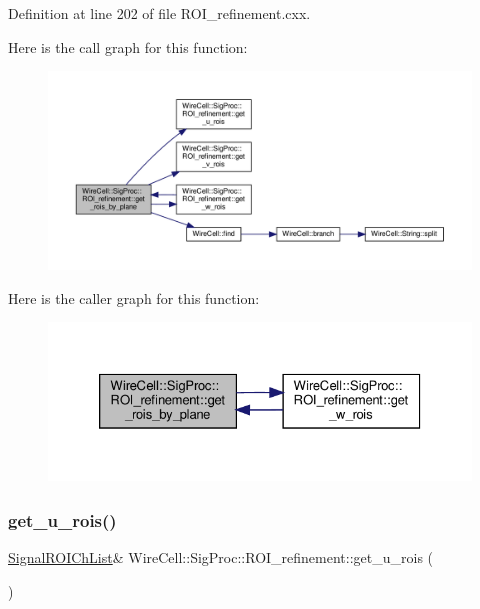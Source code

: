 Definition at line 202 of file R\+O\+I\+\_\+refinement.\+cxx.

Here is the call graph for this function\+:
\nopagebreak
\begin{figure}[H]
\begin{center}
\leavevmode
\includegraphics[width=350pt]{class_wire_cell_1_1_sig_proc_1_1_r_o_i__refinement_afd5ab2626265ce9d6efd309bfeec3639_cgraph}
\end{center}
\end{figure}
Here is the caller graph for this function\+:
\nopagebreak
\begin{figure}[H]
\begin{center}
\leavevmode
\includegraphics[width=326pt]{class_wire_cell_1_1_sig_proc_1_1_r_o_i__refinement_afd5ab2626265ce9d6efd309bfeec3639_icgraph}
\end{center}
\end{figure}
\mbox{\label{class_wire_cell_1_1_sig_proc_1_1_r_o_i__refinement_a9b1debf14ee8bae2c9a558da5308cfb3}} 
\subsubsection{\texorpdfstring{get\+\_\+u\+\_\+rois()}{get\_u\_rois()}}
{\footnotesize\ttfamily \hyperlink{namespace_wire_cell_1_1_sig_proc_a5b3db127bb7fb1e16d93fa60f52905af}{Signal\+R\+O\+I\+Ch\+List}\& Wire\+Cell\+::\+Sig\+Proc\+::\+R\+O\+I\+\_\+refinement\+::get\+\_\+u\+\_\+rois (\begin{DoxyParamCaption}{ }\end{DoxyParamCaption})\hspace{0.3cm}{\ttfamily [inline]}}



